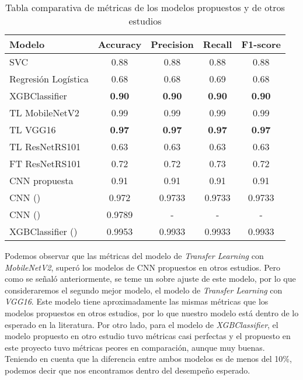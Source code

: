 \begin{table}[H]
    \centering
    \begin{tabular}{lcccc}
        \toprule
        Modelo              & Accuracy & Precision & Recall & F1-score \\
        \midrule
        SVC                 & 0.88 & 0.88 & 0.88 & 0.88 \\
        Regresión Logística & 0.68 & 0.68 & 0.69 & 0.68 \\
        XGBClassifier       & \textbf{0.90} & \textbf{0.90} & \textbf{0.90} & \textbf{0.90} \\
        TL MobileNetV2      & 0.99 & 0.99 & 0.99 & 0.99 \\
        TL VGG16            & \textbf{0.97} & \textbf{0.97} & \textbf{0.97} & \textbf{0.97} \\
        TL ResNetRS101      & 0.63 & 0.63 & 0.63 & 0.63 \\
        FT ResNetRS101      & 0.72 & 0.72 & 0.73 & 0.72 \\
        CNN propuesta       & 0.91 & 0.91 & 0.91 & 0.91 \\
        CNN ({\cite{CNN1}}) & 0.972 & 0.9733 & 0.9733 & 0.9733 \\
        CNN ({\cite{CNN2}}) & 0.9789 & - & - & - \\
        XGBClassifier ({\cite{modelo_XGBClassifier}}) & 0.9953 & 0.9933 & 0.9933 & 0.9933 \\
        \bottomrule
    \end{tabular}
    \caption{Tabla comparativa de métricas de los modelos propuestos y de otros estudios}
\end{table}

Podemos observar que las métricas del modelo de \textit{Transfer Learning} con \textit{MobileNetV2}, superó los modelos de CNN propuestos en otros estudios. Pero como se señaló anteriormente, se teme un sobre ajuste de este modelo, por lo que consideraremos el segundo mejor modelo, el modelo de \textit{Transfer Learning} con \textit{VGG16}. Este modelo tiene aproximadamente las mismas métricas que los modelos propuestos en otros estudios, por lo que nuestro modelo está dentro de lo esperado en la literatura. Por otro lado, para el modelo de \textit{XGBClassifier}, el modelo propuesto en otro estudio tuvo métricas casi perfectas y el propuesto en este proyecto tuvo métricas peores en comparación, aunque muy buenas. Teniendo en cuenta que la diferencia entre ambos modelos es de menos del 10\%, podemos decir que nos encontramos dentro del desempeño esperado.\\

